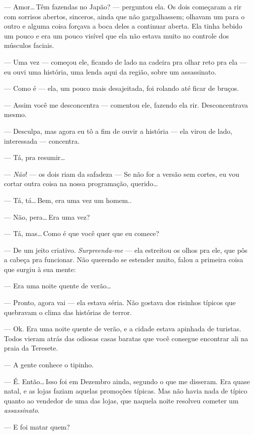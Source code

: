 --- Amor\ldots\,Têm fazendas no Japão? --- perguntou ela. Os dois começaram a rir com sorrisos abertos, sinceros, ainda que não gargalhassem; olhavam um para o outro e alguma coisa forçava a boca deles a continuar aberta. Ela tinha bebido um pouco e era um pouco visível que ela não estava muito no controle dos músculos faciais.

--- Uma vez --- começou ele, ficando de lado na cadeira pra olhar reto pra ela --- eu ouvi uma história, uma lenda aqui da região, sobre um assassinato.

--- Como é --- ela, um pouco mais desajeitada, foi rolando até ficar de bruços.

--- Assim você me desconcentra --- comentou ele, fazendo ela rir. Desconcentrava mesmo.

--- Desculpa, mas agora eu tô a fim de ouvir a história --- ela virou de lado, interessada --- concentra.

--- Tá, pra resumir\ldots

--- \emph{Não}! --- os dois riam da safadeza --- Se não for a versão sem cortes, eu vou cortar outra coisa na nossa programação, querido\ldots

--- Tá, tá\ldots\,Bem, era uma vez um homem..

--- Não, pera\ldots\,Era uma vez?

--- Tá, mas\ldots\,Como é que você quer que eu comece?

--- De um jeito criativo. \emph{Surpreenda-me} --- ela estreitou os olhos pra ele, que pôs a cabeça pra funcionar. Não querendo se estender muito, falou a primeira coisa que surgiu à sua mente:

--- Era uma noite quente de verão\ldots

--- Pronto, agora vai --- ela estava séria. Não gostava dos risinhos típicos que quebravam o clima das histórias de terror.

--- Ok. Era uma noite quente de verão, e a cidade estava apinhada de turistas. Todos vieram atrás das odiosas casas baratas que você consegue encontrar ali na praia da Teresete.

--- A gente conhece o tipinho.

--- É. Então\ldots\,Isso foi em Dezembro ainda, segundo o que me disseram. Era quase natal, e as lojas faziam aquelas promoções típicas. Mas não havia nada de típico quanto ao vendedor de uma das lojas, que naquela noite resolveu cometer um \emph{assassinato}.

--- E foi matar quem?

